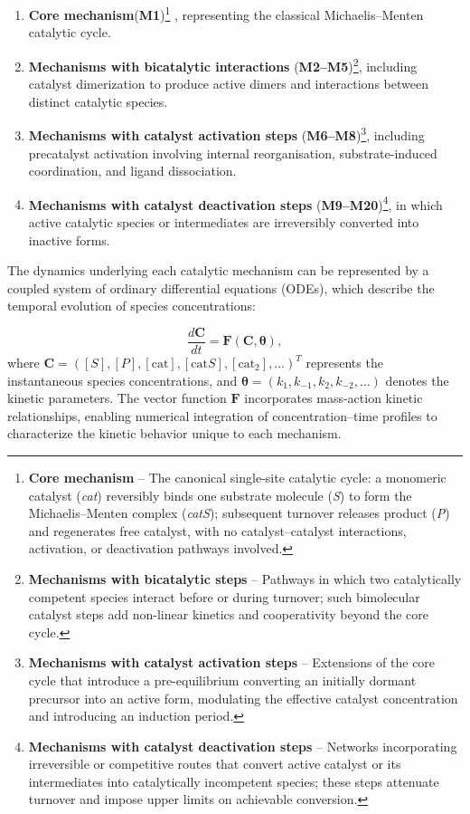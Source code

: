 \documentclass{dissertation}
\begin{document}
\begin{enumerate}
    \item \textbf{Core mechanism}(\textbf{M1})\footnote{\textbf{Core mechanism} – The canonical single-site catalytic cycle: a monomeric catalyst (\emph{cat}) reversibly binds one substrate molecule (\emph{S}) to form the Michaelis–Menten complex (\emph{catS}); subsequent turnover releases product (\emph{P}) and regenerates free catalyst, with no catalyst–catalyst interactions, activation, or deactivation pathways involved.}
    , representing the classical Michaelis–Menten catalytic cycle.

    \item \textbf{Mechanisms with bicatalytic interactions} (\textbf{M2–M5})\footnote{\textbf{Mechanisms with bicatalytic steps} – Pathways in which two catalytically competent species interact before or during turnover; such bimolecular catalyst steps add non-linear kinetics and cooperativity beyond the core cycle.}, including catalyst dimerization to produce active dimers and interactions between distinct catalytic species.


    \item \textbf{Mechanisms with catalyst activation steps} (\textbf{M6–M8})\footnote{\textbf{Mechanisms with catalyst activation steps} – Extensions of the core cycle that introduce a pre-equilibrium converting an initially dormant precursor into an active form, modulating the effective catalyst concentration and introducing an induction period.}, including precatalyst activation involving internal reorganisation, substrate-induced coordination, and ligand dissociation.

    \item \textbf{Mechanisms with catalyst deactivation steps} (\textbf{M9–M20})\footnote{\textbf{Mechanisms with catalyst deactivation steps} – Networks incorporating irreversible or competitive routes that convert active catalyst or its intermediates into catalytically incompetent species; these steps attenuate turnover and impose upper limits on achievable conversion.}, in which active catalytic species or intermediates are irreversibly converted into inactive forms.
\end{enumerate}


The dynamics underlying each catalytic mechanism can be represented by a coupled system of ordinary differential equations (ODEs), which describe the temporal evolution of species concentrations:

\begin{equation}
\frac{d\mathbf{C}}{dt} = \mathbf{F}(\mathbf{C}, \boldsymbol{\theta}),
\end{equation}
where \( \mathbf{C} = ([S], [P], [\mathrm{cat}], [\mathrm{cat}S], [\mathrm{cat}_2], \ldots)^{T}\) represents the instantaneous species concentrations, and \( \boldsymbol{\theta} = (k_1, k_{-1}, k_2, k_{-2}, \ldots) \) denotes the kinetic parameters. The vector function \( \mathbf{F} \) incorporates mass-action kinetic relationships, enabling numerical integration of concentration–time profiles to characterize the kinetic behavior unique to each mechanism.
\end{document}
